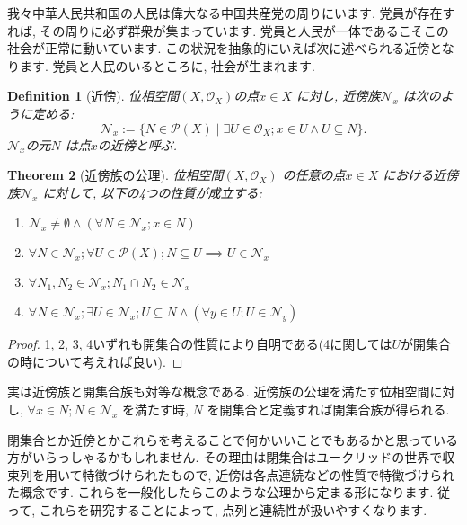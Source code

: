 \documentclass[lualatex]{ltjsbook}
\newtheorem{theorem}{Theorem}[chapter]
\newtheorem{definition}[theorem]{Definition}
\theoremstyle{remark}
\theoremstyle{plain}
\begin{document}
我々中華人民共和国の人民は偉大なる中国共産党の周りにいます. 党員が存在すれば,  その周りに必ず群衆が集まっています. 党員と人民が一体であるこそこの社会が正常に動いています. この状況を抽象的にいえば次に述べられる近傍となります. 党員と人民のいるところに,  社会が生まれます.

\begin{definition}[近傍]
	位相空間$\left( X,  \mathcal{O}_X \right)$の点$x \in X$ に対し,  近傍族$\mathcal{N}_x$ は次のように定める:
	\[
	\mathcal{N}_x := \{N \in \mathcal{P}\left( X \right)  \mid \exists U \in \mathcal{O}_X ; x \in U \land U \subseteq N \} 
	.\] 
	$\mathcal{N}_x $の元$N$ は点$x$の近傍と呼ぶ.
\end{definition}

\begin{theorem}[近傍族の公理]
	位相空間$\left( X , \mathcal{O}_X \right) $ の任意の点$x\in X$ における近傍族$\mathcal{N}_x$ に対して,  以下の4つの性質が成立する:
	\begin{enumerate}
		\item $\mathcal{N}_x \neq \emptyset \land \left( \forall N \in \mathcal{N}_x ; x \in N \right)$
		\item $\forall N \in \mathcal{N}_x; \forall U \in \mathcal{P}\left( X \right) ; N\subseteq U \implies U \in \mathcal{N}_x$
		\item $\forall N_1,  N_2 \in \mathcal{N}_x ; N_1 \cap N_2 \in \mathcal{N}_x$
		\item $\forall N \in \mathcal{N}_x; \exists U \in \mathcal{N}_x ;U\subseteq N\land \left( \forall y \in U; U \in \mathcal{N}_y  \right)  $
	\end{enumerate}
\end{theorem}

\begin{proof}
	1, 2, 3, 4いずれも開集合の性質により自明である(4に関しては$U$が開集合の時について考えれば良い).
\end{proof}

実は近傍族と開集合族も対等な概念である. 近傍族の公理を満たす位相空間に対し,  $\forall x \in N; N \in \mathcal{N}_x$ を満たす時,  $N$ を開集合と定義すれば開集合族が得られる. 

閉集合とか近傍とかこれらを考えることで何かいいことでもあるかと思っている方がいらっしゃるかもしれません.
その理由は閉集合はユークリッドの世界で収束列を用いて特徴づけられたもので,  近傍は各点連続などの性質で特徴づけられた概念です.
これらを一般化したらこのような公理から定まる形になります. 従って,  これらを研究することによって,  点列と連続性が扱いやすくなります.
\end{document}
